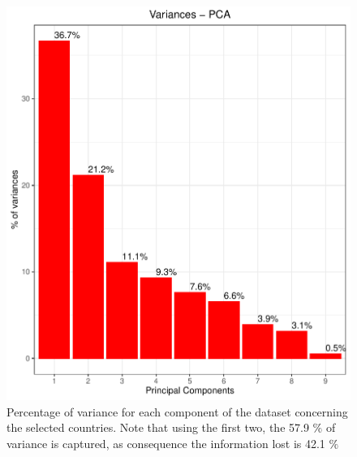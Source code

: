 \documentclass[
12pt, %
a4paper, %
oneside, %
headinclude,footinclude, %
BCOR5mm, %
]{scrartcl}
\begin{document}
\begin{figure}[h]
\begin{center}
\includegraphics[scale=1]{Pic/Variances-PCA_WORLD.pdf}
\caption{Percentage of variance for each component of the dataset concerning the selected countries. Note that using the first two, the 57.9 $\% $ of variance is captured, as consequence the information lost is 42.1 $\%$}
\label{World_variances}
\end{center}
\end{figure}
\end{document}
